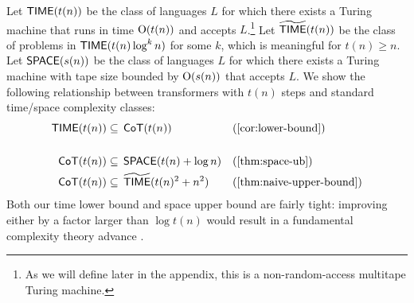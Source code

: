 \documentclass{article}
\begin{document}
Let $\mathsf{TIME}(t(n))$ be the class of languages $L$ for which there exists a Turing machine that runs in time $\mathrm{O}(t(n))$ and accepts $L$.\footnote{As we will define later in the appendix, this is a non-random-access multitape Turing machine.} Let $\widetilde{\mathsf{TIME}}(t(n))$ be the class of problems in $\mathsf{TIME}(t(n) \log^k n)$ for some $k$, which is meaningful for $t(n) \geq n$.
Let $\mathsf{SPACE}(s(n))$ be the class of languages $L$ for which there exists a Turing machine with tape size bounded by $\mathrm{O}(s(n))$ that accepts $L$.
We show the following relationship between transformers with $t(n)$ steps and standard time/space complexity classes:
\begin{align}
    \label{eq:lb}
    \TIME(t(n)) & \subseteq \, \CoT(t(n)) & & \text{(\Cref{cor:lower-bound})} \\
    \nonumber \ \\
    \label{eq:space-ub}
    \CoT(t(n)) & \subseteq \, \SPACE(t(n) + \log n) & & \text{(\Cref{thm:space-ub})} \\
    \label{eq:time-ub}
    \CoT(t(n)) & \subseteq \, \tildeTIME(t(n)^2 + n^2) & & \text{(\Cref{thm:naive-upper-bound})}
\end{align}
Both our time lower bound and space upper bound are fairly tight: improving either by a factor larger than $\log t(n)$ would result in a fundamental complexity theory advance \citep{Hopcroft1977OnTV}.

\end{document}
